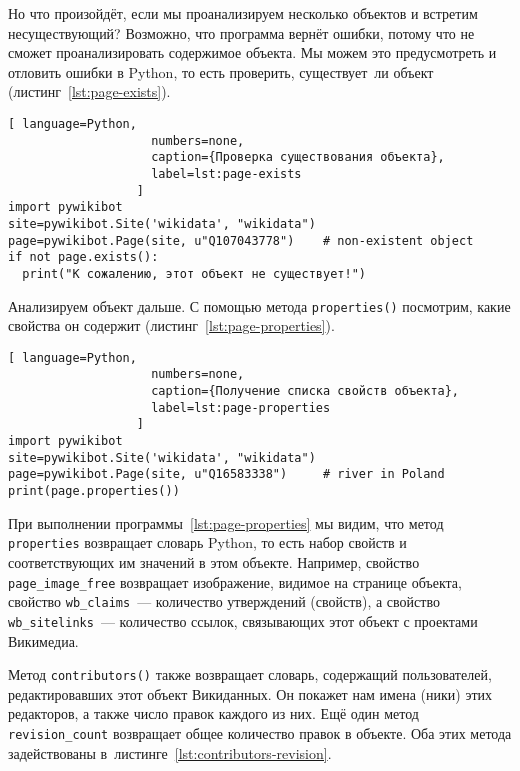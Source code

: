Но что произойдёт, если мы проанализируем несколько объектов и встретим несуществующий? 
Возможно, что программа вернёт ошибки, потому что не сможет проанализировать содержимое объекта. 
Мы можем это предусмотреть и отловить ошибки в Python, то есть проверить, существует~ли объект (листинг~\ref{lst:page-exists}).

\begin{lstlisting}[ language=Python,
                    numbers=none,
                    caption={Проверка существования объекта},
                    label=lst:page-exists
                  ]
import pywikibot
site=pywikibot.Site('wikidata', "wikidata")
page=pywikibot.Page(site, u"Q107043778")    # non-existent object
if not page.exists():
  print("К сожалению, этот объект не существует!")
\end{lstlisting}

Анализируем объект дальше. 
С помощью метода \lstinline|properties()| посмотрим, какие свойства он содержит 
(листинг~\ref{lst:page-properties}).

\begin{lstlisting}[ language=Python,
                    numbers=none,
                    caption={Получение списка свойств объекта},
                    label=lst:page-properties
                  ]
import pywikibot
site=pywikibot.Site('wikidata', "wikidata")
page=pywikibot.Page(site, u"Q16583338")     # river in Poland
print(page.properties())
\end{lstlisting}

При выполнении программы~\ref{lst:page-properties} мы видим, что метод \lstinline|properties| 
возвращает словарь Python, то есть набор свойств и соответствующих им значений в этом объекте. 
Например, свойство \lstinline|page_image_free| возвращает изображение, видимое на странице объекта, 
свойство \lstinline|wb_claims|~--- количество утверждений (свойств), 
а свойство \lstinline|wb_sitelinks|~--- количество ссылок, связывающих этот объект с проектами Викимедиа.

Метод \lstinline|contributors()| также возвращает словарь, содержащий пользователей, 
редактировавших этот объект Викиданных. 
Он покажет нам имена (ники) этих редакторов, 
а также число правок каждого из них. 
Ещё один метод \lstinline|revision_count| возвращает общее количество правок в объекте. Оба этих метода задействованы в~листинге~\ref{lst:contributors-revision}.

